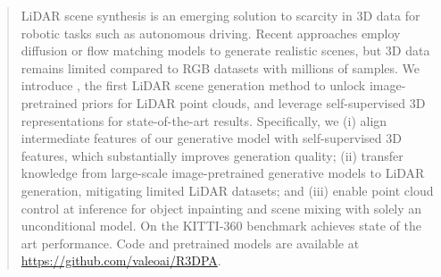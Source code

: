 \begin{abstract}
LiDAR scene synthesis is an emerging solution to scarcity in 3D data for robotic tasks such as autonomous driving.
Recent approaches employ diffusion or flow matching models to generate realistic scenes, but 3D data remains limited compared to RGB datasets with millions of samples.
We introduce \ours, the first LiDAR scene generation method to unlock image-pretrained priors for LiDAR point clouds, and leverage self-supervised 3D representations for state-of-the-art results.
Specifically, we
(i) align intermediate features of our generative model with self-supervised 3D features, which substantially improves generation quality;
(ii) transfer knowledge from large-scale image-pretrained generative models to LiDAR generation, mitigating limited LiDAR datasets;
and (iii) enable point cloud control at inference for object inpainting and scene mixing with solely an unconditional model.
On the KITTI-360 benchmark \ours achieves state of the art performance.
Code and pretrained models are available at \url{https://github.com/valeoai/R3DPA}.


\end{abstract}